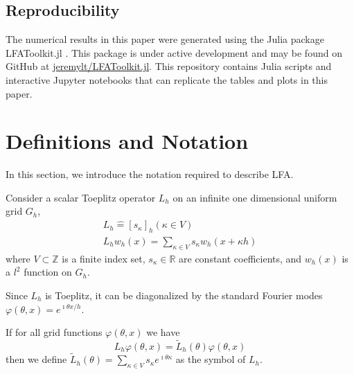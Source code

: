 \documentclass[review]{siamart190516}
\begin{document}
\subsection{Reproducibility}\label{sec:reproducibility}

The numerical results in this paper were generated using the Julia package LFAToolkit.jl \cite{thompson2021toolkit}.
This package is under active development and may be found on GitHub at \href{https://github.com/jeremylt/LFAToolkit.jl}{jeremylt/LFAToolkit.jl}.
This repository contains Julia scripts and interactive Jupyter notebooks that can replicate the tables and plots in this paper.

\section{Definitions and Notation}\label{sec:notation}

In this section, we introduce the notation required to describe LFA.

Consider a scalar Toeplitz operator $L_h$ on an infinite one dimensional uniform grid $G_h$,
\begin{equation}
\begin{split}
L_h \mathrel{\hat{=}} \left[ s_\kappa \right]_h \left( \kappa \in V \right)\\
L_h w_h \left( x \right) = \sum_{\kappa \in V} s_\kappa w_h \left( x + \kappa h \right)
\end{split}
\end{equation}
where $V \subset \mathbb{Z}$ is a finite index set, $s_\kappa \in \mathbb{R}$ are constant coefficients, and $w_h \left( x \right)$ is a $l^2$ function on $G_h$.

Since $L_h$ is Toeplitz, it can be diagonalized by the standard Fourier modes $\varphi \left( \theta, x \right) = e^{\imath \theta x / h}$.

\begin{definition}[Symbol of $L_h$]\label{def:symbol}
If for all grid functions $\varphi \left( \theta, x \right)$ we have
\begin{equation}
L_h \varphi \left( \theta, x \right) = \tilde{L}_h \left( \theta \right) \varphi \left( \theta, x \right)
\end{equation}
then we define $\tilde{L}_h \left( \theta \right) = \sum_{\kappa \in V} s_\kappa e^{\imath \theta \kappa}$ as the symbol of $L_h$.
\end{definition}
\end{document}
